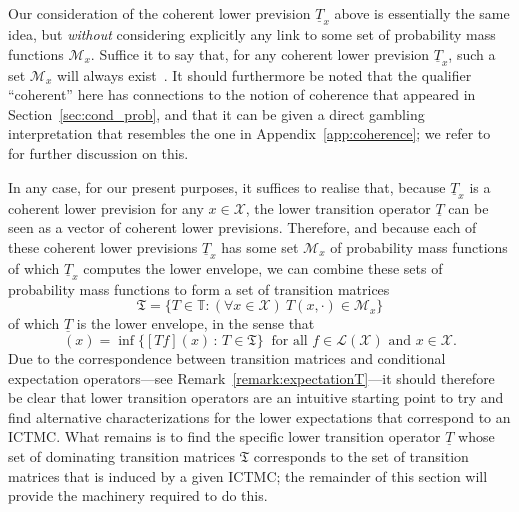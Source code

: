 \documentclass[10pt,a4paper]{paper}
\theoremstyle{definition}
\newtheorem{proposition}[theorem]{Proposition}
\newcommand{\states}{\mathcal{X}}
\newcommand{\lt}{\underline{T}}
\newcommand{\gambles}{\mathcal{L}}
\newcommand{\gamblesX}{\gambles(\states)}
\newcommand{\lrate}{\underline{Q}}
\newcommand{\norm}[1]{\left\lVert #1 \right\rVert}
\newcommand{\ictmc}{{ICTMC}}
\begin{document}
Our consideration of the coherent lower prevision $\lt_x$  above is essentially the same idea, but \emph{without} considering explicitly any link to some set of probability mass functions $\mathcal{M}_x$. Suffice it to say that, for any coherent lower prevision $\lt_x$, such a set $\mathcal{M}_x$ will always exist~\cite[Section 10.2]{Huber:1981ch}. It should furthermore be noted that the qualifier ``coherent'' here has connections to the notion of coherence that appeared in Section~\ref{sec:cond_prob}, and that it can be given a direct gambling interpretation that resembles the one in Appendix~\ref{app:coherence}; we refer to~\cite{troffaes2013:lp,Walley:1991vk} for further discussion on this.

In any case, for our present purposes, it suffices to realise that, because $\lt_x$ is a coherent lower prevision for any $x\in\states$, the lower transition operator $\lt$ can be seen as a vector of coherent lower previsions. Therefore, and because each of these coherent lower previsions $\lt_x$ has some set $\mathcal{M}_x$ of probability mass functions of which $\lt_x$ computes the lower envelope, we can combine these sets of probability mass functions to form a set of transition matrices
\begin{equation*}
\mathfrak{T}=\{T\in\mathbb{T}\colon (\forall x\in\states)~T(x,\cdot)\in\mathcal{M}_x\}
\end{equation*}
of which $\lt$ is the lower envelope, in the sense that
\begin{equation*}
[\lt f](x) = \inf\{ [Tf](x)\,:\, T\in\mathfrak{T} \}~
\text{ for all $f\in\gamblesX$ and $x\in\states$.}
\end{equation*}
Due to the correspondence between transition matrices and conditional expectation operators---see Remark~\ref{remark:expectationT}---it should therefore be clear that lower transition operators are an intuitive starting point to try and find alternative characterizations for the lower expectations that correspond to an \ictmc. What remains is to find the specific lower transition operator $\lt$ whose set of dominating transition matrices $\mathfrak{T}$ corresponds to the set of transition matrices that is induced by a given \ictmc; the remainder of this section will provide the machinery required to do this.

%
\end{document}
